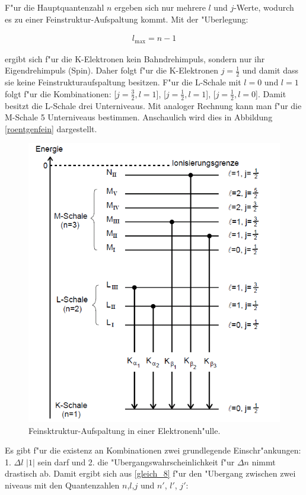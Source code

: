 		F"ur die Hauptquantenzahl $n$ ergeben sich nur mehrere $l$ und $j$-Werte, wodurch es zu einer Feinstruktur-Aufspaltung kommt.
		Mit der "Uberlegung:

		\begin{eqnarray*}
			l_\mathrm{max} = n - 1
		\end{eqnarray*}

		ergibt sich f"ur die K-Elektronen kein Bahndrehimpuls, sondern nur ihr Eigendrehimpuls (Spin). 
		Daher folgt f"ur die K-Elektronen $j = \frac{1}{2}$ und damit dass sie keine Fein\-struk\-tur\-auf\-spal\-tung besitzen.
		F"ur die L-Schale mit $l = 0$ und $l = 1$ folgt f"ur die Kombinationen: [$j = \frac{3}{2}, l = 1$], [$j = \frac{1}{2}, l = 1$], [$j = \frac{1}{2}, l = 0$].
		Damit besitzt die L-Schale drei Unterniveaus.
		Mit analoger Rechnung kann man f"ur die M-Schale 5 Unterniveaus bestimmen.
		Anschaulich wird dies in Abbildung \eqref{roentgenfein} dargestellt.

		\begin{figure}[htbp]
			\centering
			\includegraphics[width = 12cm]{img/Roentgenuebergaengefein.png}
			\caption{Feinsktruktur-Aufspaltung in einer Elektronenh"ulle.}
			\label{roentgenfein}
		\end{figure}	

		Es gibt f"ur die existenz an Kombinationen zwei grundlegende Einschr"ankungen: 
		1. $\Delta l$ \le $|1|$ sein darf und 2. die "Ubergangswahrscheinlichkeit f"ur $\Delta n$  nimmt drastisch ab. 
		Damit ergibt sich aus \eqref{gleich_8} f"ur den "Ubergang zwischen zwei niveaus mit den Quantenzahlen $n$,$l$,$j$ und $n'$, $l'$, $j'$:	

